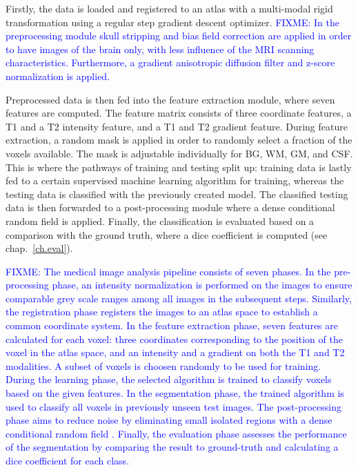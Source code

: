 \documentclass[journal]{IEEEtran}
\newcommand\FIXME[1]{\textcolor{blue}{FIXME: #1}}
\begin{document}
Firstly, the data is loaded and registered to an atlas with a multi-modal rigid transformation using a regular step gradient descent optimizer. \FIXME{In the preprocessing module skull stripping and bias field correction are applied in order to have images of the brain only, with less influence of the MRI scanning characteristics. Furthermore, a gradient anisotropic diffusion filter and z-score normalization is applied.}

Preprocessed data is then fed into the feature extraction module, where seven features are computed. The feature matrix consists of three coordinate features, a T1 and a T2 intensity feature, and a T1 and T2 gradient feature. During feature extraction, a random mask is applied in order to randomly select a fraction of the voxels available. The mask is adjustable individually for BG, WM, GM, and CSF. This is where the pathways of training and testing split up: training data is lastly fed to a certain supervised machine learning algorithm for training, whereas the testing data is classified with the previously created model. The classified testing data is then forwarded to a post-processing module where a dense conditional random field \cite{krahenbuhl2011efficient} is applied.
Finally, the classification is evaluated based on a comparison with the ground truth, where a dice coefficient is computed (see chap.~\ref{ch.eval}).


\FIXME{The medical image analysis pipeline consists of seven phases. In the pre-processing phase, an intensity normalization is performed on the images to ensure comparable grey scale ranges among all images in the subsequent steps. Similarly, the registration phase registers the images to an atlas space to establish a common coordinate system. In the feature extraction phase, seven features are calculated for each voxel: three coordinates corresponding to the position of the voxel in the atlas space, and an intensity and a gradient on both the T1 and T2 modalities. A subset of voxels is choosen randomly to be used for training. During the learning phase, the selected algorithm is trained to classify voxels based on the given features. In the segmentation phase, the trained algorithm is used to classify all voxels in previously unseen test images. The post-processing phase aims to reduce noise by eliminating small isolated regions with a dense conditional random field \cite{krahenbuhl2011efficient}. Finally, the evaluation phase assesses the performance of the segmentation by comparing the result to ground-truth and calculating a dice coefficient for each class.}
\end{document}

